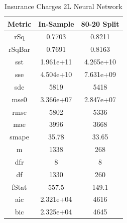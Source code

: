 \documentclass{article}
\begin{document}
\begin{table}[H]
\centering
\caption{Insurance Charges 2L Neural Network}
\label{tab:Insurance Charges 2L Neural Network}
\begin{tabular}{|c|c|c|}\hline
Metric & In-Sample & 80-20 Split \\ \hline \hline
rSq & 0.7703 & 0.8211 \\ \hline
rSqBar & 0.7691 & 0.8163 \\ \hline
sst & 1.961e+11 & 4.265e+10 \\ \hline
sse & 4.504e+10 & 7.631e+09 \\ \hline
sde & 5819 & 5418 \\ \hline
mse0 & 3.366e+07 & 2.847e+07 \\ \hline
rmse & 5802 & 5336 \\ \hline
mae & 3996 & 3668 \\ \hline
smape & 35.78 & 33.65 \\ \hline
m & 1338 & 268 \\ \hline
dfr & 8 & 8 \\ \hline
df & 1330 & 260 \\ \hline
fStat & 557.5 & 149.1 \\ \hline
aic & 2.321e+04 & 4616 \\ \hline
bic & 2.325e+04 & 4645 \\ \hline
\end{tabular}
\end{table}
\end{document}
